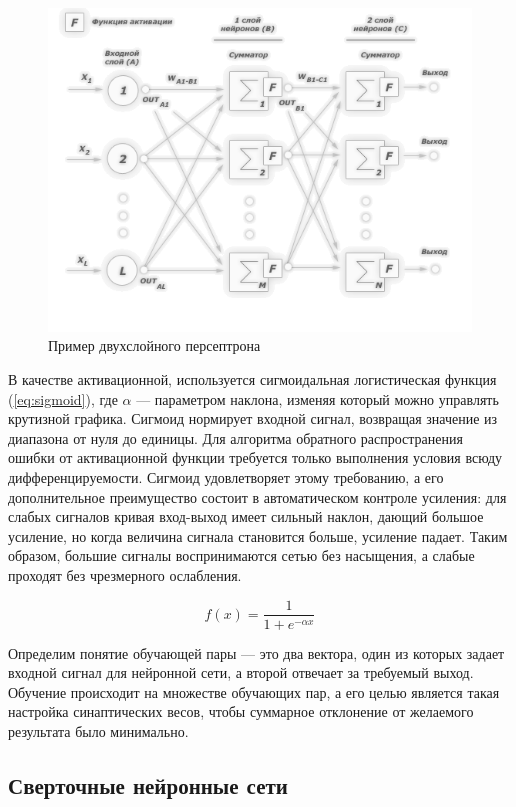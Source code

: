 \documentclass[a4paper,14pt]{extarticle} %
\begin{document}
\begin{figure}[h]
\centering
\includegraphics[width=0.75\linewidth]{NN_multilayer_networks_01}
\caption{Пример двухслойного персептрона}
\label{fig:NN_multilayer_networks_01}
\end{figure}

В качестве активационной, используется сигмоидальная логистическая функция (\ref{eq:sigmoid}), где $\alpha$ --- параметром наклона, изменяя который можно управлять крутизной графика. Сигмоид нормирует входной сигнал, возвращая значение из диапазона от нуля до единицы. Для алгоритма обратного распространения ошибки от активационной функции требуется только выполнения условия всюду дифференцируемости. Сигмоид удовлетворяет этому требованию, а его дополнительное преимущество состоит в автоматическом контроле усиления: для слабых сигналов кривая вход-выход имеет сильный наклон, дающий большое усиление, но когда величина сигнала становится больше, усиление падает. Таким образом, большие сигналы воспринимаются сетью без насыщения, а слабые проходят без чрезмерного ослабления. 

\begin{equation}\label{eq:sigmoid}
f(x)=\frac{1}{1+e^{-\alpha x}}
\end{equation}

Определим понятие обучающей пары --- это два вектора, один из которых задает входной сигнал для нейронной сети, а второй отвечает за требуемый выход. Обучение происходит на множестве обучающих пар, а его целью является такая настройка синаптических весов, чтобы суммарное отклонение от желаемого результата было минимально.

\subsection{Сверточные нейронные сети}
\hspace{\parindent} 
\end{document}
